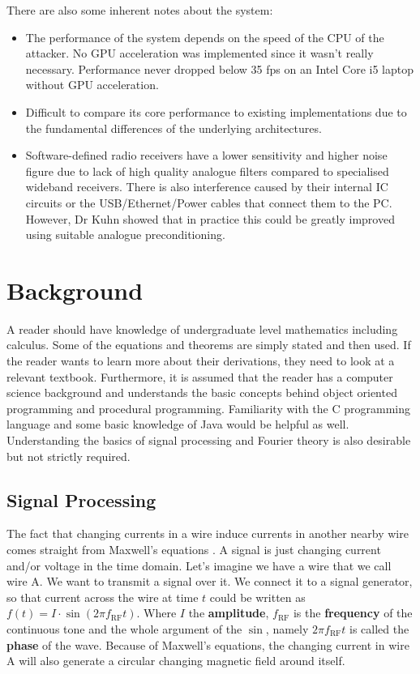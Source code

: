 \documentclass[a4paper,12pt,twoside,openright]{report}
\begin{document}
There are also some inherent notes about the system:
\begin{itemize}

  \item The performance of the system depends on the speed of the CPU of the attacker. No GPU acceleration was implemented since it wasn't really necessary. Performance never dropped below 35 fps on an Intel Core i5 laptop without GPU acceleration.
  \item Difficult to compare its core performance to existing implementations due to the fundamental differences of the underlying architectures.
  \item Software-defined radio receivers have a lower sensitivity and higher noise figure due to lack of high quality analogue filters compared to specialised wideband receivers. There is also interference caused by their internal IC circuits or the USB/Ethernet/Power cables that connect them to the PC. However, Dr Kuhn showed that in practice this could be greatly improved using suitable analogue preconditioning.
  
\end{itemize}

\chapter{Background}

A reader should have knowledge of undergraduate level mathematics including calculus. Some of the equations and theorems are simply stated and then used. If the reader wants to learn more about their derivations, they need to look at a relevant textbook. Furthermore, it is assumed that the reader has a computer science background and understands the basic concepts behind object oriented programming and procedural programming. Familiarity with the C programming language and some basic knowledge of Java would be helpful as well. Understanding the basics of signal processing and Fourier theory is also desirable but not strictly required.

\section{Signal Processing} 

The fact that changing currents in a wire induce currents in another nearby wire comes straight from Maxwell's equations \cite{maxwell1881treatise}. A signal is just changing current and/or voltage in the time domain. Let's imagine we have a wire that we call wire A. We want to transmit a signal over it. We connect it to a signal generator, so that current across the wire at time $t$ could be written as $f(t) = I \cdot \sin(2\pi f_\text{RF} t)$. Where $I$ the \textbf{amplitude}, $f_\text{RF}$ is the \textbf{frequency} of the continuous tone and the whole argument of the $\sin$, namely $2\pi f_\text{RF} t$ is called the \textbf{phase} of the wave. Because of Maxwell's equations, the changing current in wire A will also generate a circular changing magnetic field around itself.
\end{document}
